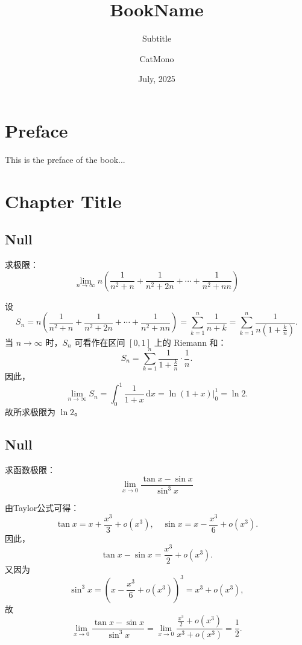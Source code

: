 \documentclass[11pt]{../../TexTemplate/elegantbook} %
\title{BookName} %
\subtitle{Subtitle} %
\author{CatMono} %
\date{July, 2025} %
\begin{document}
\maketitle %

\frontmatter        %
\tableofcontents    %

\chapter{Preface}   %
This is the preface of the book...

\mainmatter         %
\chapter{Chapter Title} %
\section{Null}
求极限：
\[
\lim_{n \to \infty} n\left( \frac{1}{n^{2}+n} + \frac{1}{n^{2}+2n} + \cdots + \frac{1}{n^{2}+nn} \right) 
\]
\begin{solution}
    设
    \[
    S_{n} = n\left( \frac{1}{n^{2}+n} + \frac{1}{n^{2}+2n} + \cdots + \frac{1}{n^{2}+nn} \right) 
    = \sum_{k=1}^{n} \frac{1}{n+k} = \sum_{k=1}^{n} \frac{1}{n\left( 1+\frac{k}{n} \right)}.
    \]
    当 \( n \to \infty \) 时，\( S_{n} \) 可看作在区间 \( [0, 1] \) 上的 Riemann 和：
    \[
    S_{n} = \sum_{k=1}^{n} \frac{1}{1+\frac{k}{n}} \cdot \frac{1}{n}.
    \]
    因此，
    \[
    \lim_{n \to \infty} S_{n} = \int_{0}^{1} \frac{1}{1+x} \, \mathrm{d}x = \left. \ln(1+x) \right|_{0}^{1} = \ln 2.
    \]
    故所求极限为 \( \ln 2 \)。
\end{solution}

\section{Null}
求函数极限：
\[
\lim_{x \to 0} \frac{\tan x- \sin x}{\sin^{3} x}
\]
\begin{solution}
    由Taylor公式可得：
    \[
    \tan x = x + \frac{x^{3}}{3} + o(x^{3}), \quad \sin x = x - \frac{x^{3}}{6} + o(x^{3}).
    \]
    因此，
    \[
    \tan x - \sin x = \frac{x^{3}}{2} + o(x^{3}).
    \]
    又因为
    \[
    \sin^{3} x = \left( x - \frac{x^{3}}{6} + o(x^{3}) \right)^{3} = x^{3} + o(x^{3}),
    \]
    故
    \[
    \lim_{x \to 0} \frac{\tan x - \sin x}{\sin^{3} x} = \lim_{x \to 0} \frac{\frac{x^{3}}{2} + o(x^{3})}{x^{3} + o(x^{3})} = \frac{1}{2}.
    \]
\end{solution}
\end{document}

